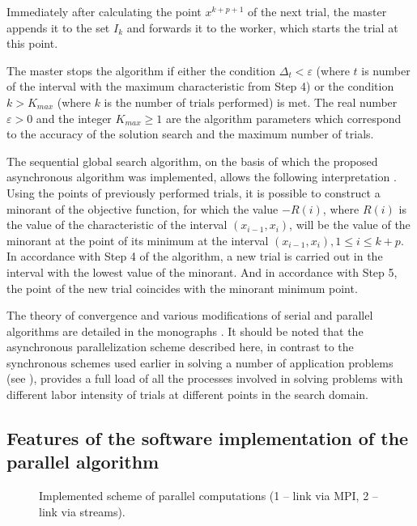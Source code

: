 \documentclass[mathematics,article,submit,pdftex,moreauthors]{Definitions/mdpi}
\begin{document}
Immediately after calculating the point $x^{k+p+1}$ of the next trial, the master appends it to the set $I_k$ and forwards it to the worker, which starts the trial at this point. 

The master stops the algorithm if either the condition $\Delta_{t}<\varepsilon$ (where $t$ is number of the interval with the maximum characteristic from Step 4) or the condition $k>K_{max}$ (where $k$ is the number of trials performed) is met.
The real number $\varepsilon>0$ and the integer $K_{max} \geq 1$ are the algorithm parameters which correspond to the accuracy of the solution search and the maximum number of trials.

The sequential global search algorithm, on the basis of which the proposed asynchronous algorithm was implemented, allows the following interpretation \cite{Molinaro2001}. Using the points of previously performed trials, it is possible to construct a minorant of the objective function, for which the value $-R(i)$, where $R(i)$ is the value of the characteristic of the interval $(x_{i-1}, x_i)$, will be the value of the minorant at the point of its minimum at the interval $(x_{i-1},x_i), 1\leq i\leq k+p$. In accordance with Step 4 of the algorithm, a new trial is carried out in the interval with the lowest value of the minorant. And in accordance with Step 5, the point of the new trial coincides with the minorant minimum point.

The theory of convergence and various modifications of serial and parallel algorithms are detailed in the monographs \cite{Strongin2000,Sergeyev2017}. 
It should be noted that the asynchronous parallelization scheme described here, in contrast to the synchronous schemes used earlier in solving a number of application problems (see \cite{Kalyulin2017, Modorskii2016}), provides a full load of all the processes involved in solving problems with different labor intensity of trials at different points in the search domain.


\subsection{Features of the software implementation of the parallel algorithm}

\begin{figure}
\caption{Implemented scheme of parallel computations (1 -- link via MPI, 2 -- link via streams).}\label{fig:Impl}
\end{figure}   
\end{document}
